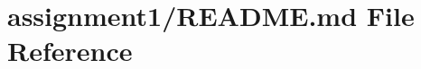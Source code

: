 \hypertarget{assignment1_2_r_e_a_d_m_e_8md}{}\section{assignment1/\+R\+E\+A\+D\+ME.md File Reference}
\label{assignment1_2_r_e_a_d_m_e_8md}
